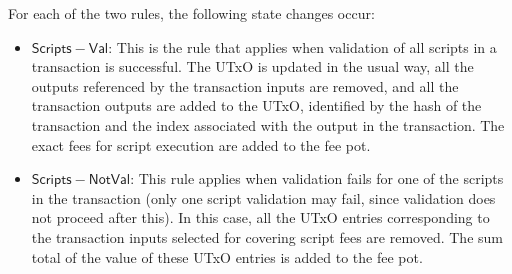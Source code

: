 For each of the two rules, the following state changes occur:

\begin{itemize}
  \item $\mathsf{Scripts-Val}$: This is the rule that applies when validation
  of all scripts in a transaction is successful. The UTxO is updated in the usual way, all
  the outputs referenced by the transaction inputs are removed, and all the
  transaction outputs are added to the UTxO, identified by the hash of
  the transaction and the index associated with the output in the transaction.
  The exact fees for script execution are added to the fee pot.

  \item $\mathsf{Scripts-NotVal}$: This rule applies when validation fails
  for one of the scripts in the transaction (only one script validation may fail,
  since validation does not proceed after this). In this case, all the
  UTxO entries corresponding to the transaction inputs selected for covering
  script fees are removed. The sum total of the value of these UTxO entries
  is added to the fee pot.
\end{itemize}


